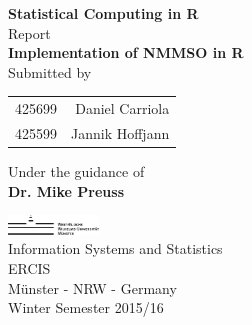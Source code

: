 \begin{titlepage}

\begin{center}

\textup{\small {\bf Statistical Computing in R} \\ Report}\\[0.2in]

\Large \textbf {Implementation of NMMSO in R}\\[0.5in]

\normalsize Submitted by \\
\begin{table}[h]
\centering
\begin{tabular}{lr}
425699 & Daniel Carriola \\ 
425599 & Jannik Hoffjann \\
\end{tabular}
\end{table}

\vspace{.1in}
Under the guidance of\\
{\textbf{Dr. Mike Preuss}}\\[0.2in]

\vfill

\includegraphics[width=0.18\textwidth]{./assets/wwu-logo}\\[0.1in]
\Large{Information Systems and Statistics}\\
\normalsize
\textsc{ERCIS}\\
Münster - NRW - Germany \\
\vspace{0.2cm}
Winter Semester 2015/16

\end{center}

\end{titlepage}